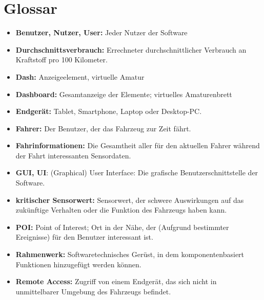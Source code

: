 \documentclass[pflichtenheft.tex]{subfiles}
\begin{document}
\chapter{Glossar}

\begin{itemize}

\item
\textbf{Benutzer, Nutzer, User:} Jeder Nutzer der Software

\item
\textbf{Durchschnittsverbrauch:} Errechneter durchschnittlicher Verbrauch an Kraftstoff pro 100 Kilometer.

\item
\textbf{Dash: } Anzeigeelement, virtuelle Amatur

\item
\textbf{Dashboard: } Gesamtanzeige der Elemente; virtuelles Amaturenbrett

\item
\textbf{Endgerät:} Tablet, Smartphone, Laptop oder Desktop-PC.

\item
\textbf{Fahrer:} Der Benutzer, der das Fahrzeug zur Zeit fährt.

\item
\textbf{Fahrinformationen:} Die Gesamtheit aller für den aktuellen Fahrer während der Fahrt interessanten Sensordaten.

\item
\textbf{GUI, UI}: (Graphical) User Interface: Die grafische Benutzerschnittstelle der Software.

\item
\textbf{kritischer Sensorwert:} Sensorwert, der schwere Auswirkungen auf das zukünftige Verhalten oder die Funktion des Fahrzeugs haben kann.

\item
\textbf{POI:} Point of Interest; Ort in der Nähe, der (Aufgrund bestimmter Ereignisse) für den Benutzer interessant ist.

\item
\textbf{Rahmenwerk: } Softwaretechnisches Gerüst, in dem komponentenbasiert Funktionen hinzugefügt werden können. 

\item
\textbf{Remote Access:} Zugriff von einem Endgerät, das sich nicht in unmittelbarer Umgebung des Fahrzeugs befindet.

\end{itemize}
\end{document}
